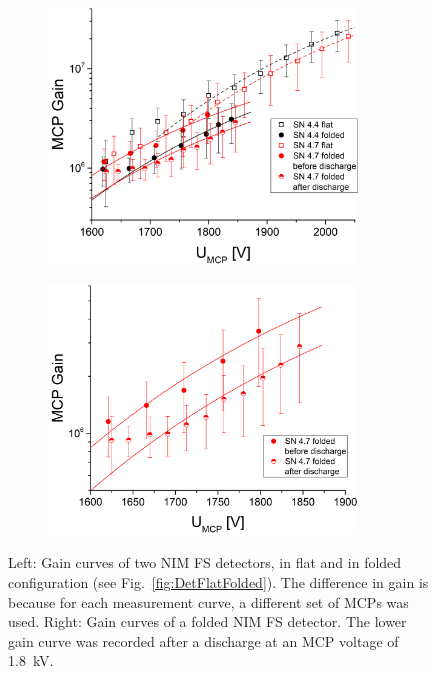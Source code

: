 	\begin{figure}[H] %
		\begin{subfigure}{.5\textwidth}
			\centering
			\includegraphics[width=0.9\textwidth]{Experiments/Gain_Curves_SN4p5_4p7.png}
		\end{subfigure}
		\begin{subfigure}{.5\textwidth}
			\centering
			\includegraphics[width=0.9\textwidth]{Experiments/SN4p7_discharge.png}
		\end{subfigure}
		\caption{Left: Gain curves of two NIM FS detectors, in flat and in folded configuration (see Fig.~\ref{fig:DetFlatFolded}). The difference in gain is because for each measurement curve, a different set of MCPs was used. Right: Gain curves of a folded NIM FS detector. The lower gain curve was recorded after a discharge at an MCP voltage of 1.8~kV.}
		\label{fig:SN4p54p7Gain}
	\end{figure}
